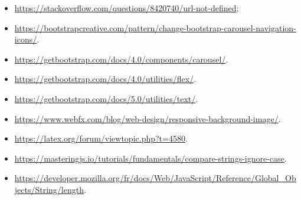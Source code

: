 \documentclass[12pt, french]{article}
\begin{document}
\begin{itemize}
    \item \url{https://stackoverflow.com/questions/8420740/url-not-defined};
    \item \url{https://bootstrapcreative.com/pattern/change-bootstrap-carousel-navigation-icons/}.
    \item \url{https://getbootstrap.com/docs/4.0/components/carousel/}.
    \item \url{https://getbootstrap.com/docs/4.0/utilities/flex/}.
    \item \url{https://getbootstrap.com/docs/5.0/utilities/text/}.
    \item \url{https://www.webfx.com/blog/web-design/responsive-background-image/}.
    \item \url{https://latex.org/forum/viewtopic.php?t=4580}.
    \item \url{https://masteringjs.io/tutorials/fundamentals/compare-strings-ignore-case}.
    \item \url{https://developer.mozilla.org/fr/docs/Web/JavaScript/Reference/Global_Objects/String/length}.
\end{itemize}
\end{document}

